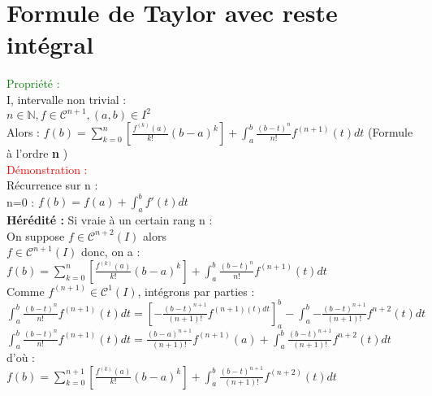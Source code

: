 \documentclass{article}
\begin{document}
\section{Formule de Taylor avec reste intégral}
\textcolor{green}{Propriété :} \\ 
I, intervalle non trivial : \\
$n \in \mathbb{N}, f \in \mathcal{C}^{n+1}, (a,b) \in I^2$ \\ 
Alors : $f(b)=\sum_{k=0}^n[\frac{f^{(k)}(a)}{k!}(b-a)^k]+ \int_a^b \frac{(b-t)^n}{n!}f^{(n+1)}(t)dt$ (Formule à l'ordre {\bf n} ) \\ 
\textcolor{red}{Démonstration :} \\ 
Récurrence sur n : \\ 
n=0 : $f(b)=f(a)+ \int_a^bf'(t)dt$ \\ 
{\bf Hérédité :} Si vraie à un certain rang n : \\ 
On suppose $f \in \mathcal{C}^{n+2}(I)$ alors \\ 
$f \in \mathcal{C}^{n+1}(I)$ donc, on a : \\ 
$f(b)=\sum_{k=0}^n[\frac{f^{(k)}(a)}{k!}(b-a)^k]+ \int_a^b \frac{(b-t)^n}{n!}f^{(n+1)}(t)dt$ \\ 
Comme $f^{(n+1)} \in \mathcal{C}^1(I)$, intégrons par parties : \\ 
$\int_a^b \frac{(b-t)^n}{n!}f^{(n+1)}(t)dt=[-\frac{(b-t)^{n+1}}{(n+1)!}f^{(n+1)(t)dt}]_a^b- \int^{b}_{a}{-\frac{(b-t)^{n+1}}{(n+1)!}f^{n+2}(t)dt}$ \\ 
$\int_a^b \frac{(b-t)^n}{n!}f^{(n+1)}(t)dt=\frac{(b-a)^{n+1}}{(n+1)!}f^{(n+1)}(a)+\int^{b}_{a}{\frac{(b-t)^{n+1}}{(n+1)!}f^{n+2}(t)dt}$ \\ 
d'où : \\
$f(b)=\sum_{k=0}^{n+1}[\frac{f^{(k)}(a)}{k!}(b-a)^k]+ \int_a^b \frac{(b-t)^{n+1}}{(n+1)!}f^{(n+2)}(t)dt$
\end{document}
